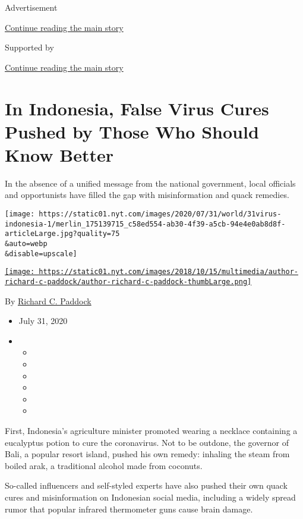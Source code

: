 Advertisement

\protect\hyperlink{after-top}{Continue reading the main story}

Supported by

\protect\hyperlink{after-sponsor}{Continue reading the main story}

\hypertarget{in-indonesia-false-virus-cures-pushed-by-those-who-should-know-better}{%
\section{In Indonesia, False Virus Cures Pushed by Those Who Should Know
Better}\label{in-indonesia-false-virus-cures-pushed-by-those-who-should-know-better}}

In the absence of a unified message from the national government, local
officials and opportunists have filled the gap with misinformation and
quack remedies.

\texttt{[image: https://static01.nyt.com/images/2020/07/31/world/31virus-indonesia-1/merlin\_175139715\_c58ed554-ab30-4f39-a5cb-94e4e0ab8d8f-articleLarge.jpg?quality=75\\\&auto=webp\\\&disable=upscale]}

\href{https://www.nytimes.com/by/richard-c-paddock}{\texttt{[image: https://static01.nyt.com/images/2018/10/15/multimedia/author-richard-c-paddock/author-richard-c-paddock-thumbLarge.png]}}

By \href{https://www.nytimes.com/by/richard-c-paddock}{Richard C.
Paddock}

\begin{itemize}
\item
  July 31, 2020
\item
  \begin{itemize}
  \item
  \item
  \item
  \item
  \item
  \item
  \end{itemize}
\end{itemize}

First, Indonesia's agriculture minister promoted wearing a necklace
containing a eucalyptus potion to cure the coronavirus. Not to be
outdone, the governor of Bali, a popular resort island, pushed his own
remedy: inhaling the steam from boiled arak, a traditional alcohol made
from coconuts.

So-called influencers and self-styled experts have also pushed their own
quack cures and misinformation on Indonesian social media, including a
widely spread rumor that popular infrared thermometer guns cause brain
damage.

